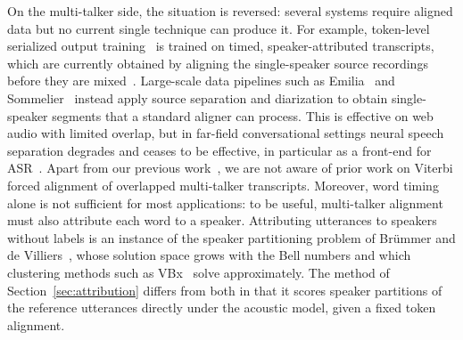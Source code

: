 On the multi-talker side, the situation is reversed: several systems require aligned data but no current single technique can produce it. For example, token-level serialized output training~\cite{kanda2020sot, kanda22_interspeech} is trained on timed, speaker-attributed transcripts, which are currently obtained by aligning the single-speaker source recordings before they are mixed~\cite{polok2026mindgap}. Large-scale data pipelines such as Emilia~\cite{he2024emilia} and Sommelier~\cite{jung2026sommelier} instead apply source separation and diarization to obtain single-speaker segments that a standard aligner can process. This is effective on web audio with limited overlap, but in far-field conversational settings neural speech separation degrades and ceases to be effective, in particular as a front-end for ASR~\cite{cornell2025recent}. Apart from our previous work~\cite{wiesner2026modeling}, we are not aware of prior work on Viterbi forced alignment of overlapped multi-talker transcripts. Moreover, word timing alone is not sufficient for most applications: to be useful, multi-talker alignment must also attribute each word to a speaker. Attributing utterances to speakers without labels is an instance of the speaker partitioning problem of Br\"ummer and de Villiers~\cite{brummer2010partitioning}, whose solution space grows with the Bell numbers and which clustering methods such as VBx~\cite{landini2022vbx} solve approximately. The method of Section~\ref{sec:attribution} differs from both in that it scores speaker partitions of the reference utterances directly under the acoustic model, given a fixed token alignment.